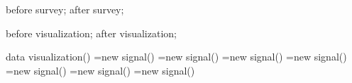 {


  \attribute before survey;
  \attribute after survey;

  \attribute before visualization;
  \attribute after visualization;

  
  \method data visualization() {
    \pgfoonew \pgfsignalpreparedatapoint=new signal()%
    \pgfoonew \pgfsignalmapdatapoint=new signal()%
    \pgfoonew \pgfsignaltransformdatapoint=new signal()%
    \pgfoonew \pgfsignalvisualizedatapoint=new signal()%
    \pgfoonew \pgfsignalfinishdatapoint=new signal()%
    \pgfoonew \pgfsignalsurveydatapoint=new signal()%
    \pgfoonew \pgfsignalphase=new signal()%
    \let\pgf@dataset@collection=\pgfutil@empty%
  }

  \def\pgfdvbeginsurvey{1}
  \def\pgfdvendsurvey{2}
  \def\pgfdvbeginvisualization{3}
  \def\pgfdvendvisualization{4}


}
